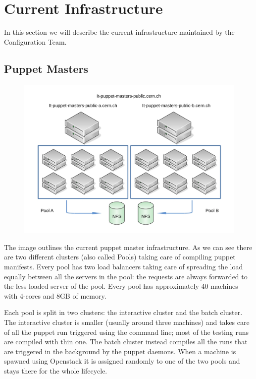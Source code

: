 \section{Current Infrastructure}

In this section we will describe the current infrastructure maintained by
the Configuration Team.

\subsection{Puppet Masters}

\begin{figure}[H]
\includegraphics[width=\textwidth,height=\textheight,keepaspectratio]{ConfigurationManagement/Infrastructure_pm.jpg}
\end{figure}

The image outlines the current puppet master infrastructure. As we can see
there are two different clusters (also called Pools) taking care of
compiling puppet manifests. Every pool has two load balancers taking care
of spreading the load equally between all the servers in the pool: the
requests are always forwarded to the less loaded server of the pool. Every
pool has approximately 40 machines with 4-cores and 8GB of memory.

Each pool is split in two clusters: the interactive cluster and the batch
cluster. The interactive cluster is smaller (usually around three
machines) and takes care of all the puppet run triggered using the command
line; most of the testing runs are compiled with thin one. The batch
cluster instead compiles all the runs that are triggered in the background
by the puppet daemons. When a machine is spawned using Openstack it is
assigned randomly to one of the two pools and stays there for the whole
lifecycle.

